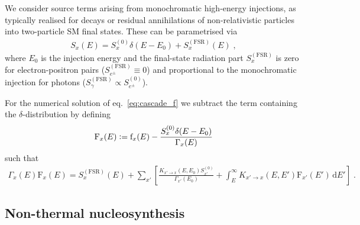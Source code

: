 \documentclass[11pt,a4paper]{article}
\newcommand{\fpdi}{\mathrm{f}}
\newcommand{\Fpdi}{\mathrm{F}}
\renewcommand{\d}{\text{d}}
\newcommand{\eqsp}{\;}
\newcommand{\X}{x}
\newcommand{\ldefine}{\vcentcolon=}
\begin{document}
We consider source terms arising from monochromatic high-energy injections, as typically realised for decays or residual annihilations of non-relativistic particles into two-particle SM final states.
These can be parametrised via
\begin{align}
S_\X(E) = S_\X^{(0)} \delta(E-E_0) + S_\X^{(\text{FSR})}(E)\eqsp,
\label{eq:SXE_definition}
\end{align}
where $E_0$ is the injection energy and the final-state radiation part $S_\X^{(\text{FSR})}$ is zero for electron-positron pairs ($S_{e^\pm}^{(\text{FSR})} \equiv 0$) and proportional to the monochromatic injection for photons ($S_{\gamma}^{(\text{FSR})} \propto S_{e^\pm}^{(0)}$).

For the numerical solution of eq.~\eqref{eq:cascade_f} we subtract the term containing the $\delta$-distribution by defining
\begin{align}
\Fpdi_\X(E) \ldefine \fpdi_\X(E) - \frac{S_\X^{(0)} \delta(E-E_0)}{\Gamma_\X(E)}
\label{eq:Ff_relation}
\end{align}
such that
\begin{align}
\Gamma_\X(E) \Fpdi_\X(E) = S_{\X}^{(\text{FSR})}(E) + \sum_{\X'} \left[ \frac{K_{\X' \to \X} (E, E_0) S_{\X'}^{(0)}}{\Gamma_{\X'} (E_0)} + \int_{E}^{\infty} K_{\X' \to \X} (E, E') \Fpdi_{\X'}(E')\,\d E'\right] \eqsp.
\label{eq:cascade_full}
\end{align}

\subsection{Non-thermal nucleosynthesis}
\end{document}
